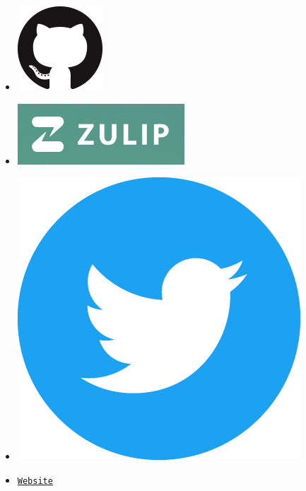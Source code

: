 \begin{frame}
\begin{multicols}{2}
  \begin{itemize}\setlength\itemsep{1em}
    \item[] \hspace{0.3cm} \href{https://github.com/OpenSourceEconomics}{\includegraphics[scale=0.15]{material/crop-github-mark.png}}
    \item[] \href{https://zulipchat.com/hello/}{\includegraphics[scale=0.35]{material/crop-zulip-mark.png}}
    \item[] \hspace{0.3cm} \href{https://twitter.com/open_econ}{\includegraphics[scale=0.05]{material/crop-twitter-mark.png}}
    \item[] \hspace{0.05cm} \href{https://open-econ.org}{\texttt{Website}}
  \end{itemize}\vspace{0.3cm}


      \end{multicols}

\end{frame}

